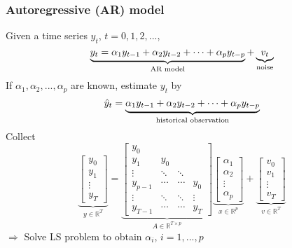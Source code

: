 \begin{multicols}{2}
\subsubsection{Autoregressive (AR) model}
Given  a time series $y_t$, $t=0,1,2,...$, 
\[
    \underbrace{y_t = \alpha_1y_{t-1} + \alpha_2y_{t-2} +\cdots +\alpha_py_{t-p}}_{\text{\rm AR model}} + \underbrace{v_t}_{\text{\rm noise}}
\]
If $\alpha_1,\alpha_2,...,\alpha_p$ are known, estimate $y_t$ by 
\[
    \hat{y}_t =  \underbrace{\alpha_1y_{t-1} + \alpha_2y_{t-2} +\cdots +\alpha_py_{t-p}}_{\text{\rm historical observation}}
\]
Collect
\[
    \underbrace{
    \left[\begin{array}{l}
        y_0 \\
        y_1 \\
        \vdots \\
        y_T
    \end{array}
    \right]}_{y\in\mathbb{R}^T}
    =
    \underbrace{
    \left[\begin{array}{cccc}
        y_0 &     & &\\
        y_1 & y_0 && \\
        \vdots & \ddots& \ddots & \\
        y_{p-1}& \cdots& \cdots & y_0 \\
        \vdots &  \ddots&\ddots & \vdots \\
        y_{T-1} & \cdots&\cdots & y_T
    \end{array}
    \right]}_{A\in\mathbb{R}^{T\times p}}
    \underbrace{
    \left[\begin{array}{l}
        \alpha_1 \\
        \alpha_2 \\
        \vdots \\
        \alpha_p
    \end{array}
    \right]}_{x\in\mathbb{R}^p}
    +
    \underbrace{
    \left[\begin{array}{l}
        v_0 \\
        v_1 \\
        \vdots \\
        v_T
    \end{array}
    \right]}_{v\in \mathbb{R}^T}
\]
$\Longrightarrow$ Solve LS problem to obtain $\alpha_i$, $i=1,...,p$

\end{multicols}
